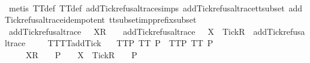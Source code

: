 %
\isadelimproof
\ \ %
\endisadelimproof
%
\isatagproof
{}\isamarkupfalse%
\ {\isacharparenleft}metis\ TT{}{\isacharunderscore}def\ TT{}{\isacharunderscore}def\ add{\isacharunderscore}Tick{\isacharunderscore}refusal{\isacharunderscore}trace{\isachardot}simps{\isacharparenleft}{}{\isacharparenright}\ add{\isacharunderscore}Tick{\isacharunderscore}refusal{\isacharunderscore}trace{\isacharunderscore}tt{\isacharunderscore}subset\ add{\isacharunderscore}Tick{\isacharunderscore}refusal{\isacharunderscore}trace{\isacharunderscore}idempotent\ tt{\isacharunderscore}subset{\isacharunderscore}imp{\isacharunderscore}prefix{\isacharunderscore}subset{\isacharparenright}%
\endisatagproof
{\isafoldproof}%
%
\isadelimproof
\isanewline
%
\endisadelimproof
\isanewline
{}\isamarkupfalse%
\ {\isachardoublequoteopen}add{\isacharunderscore}Tick{\isacharunderscore}refusal{\isacharunderscore}trace\ {\isacharparenleft}{\isasymrho}\ {\isacharat}\ {\isacharbrackleft}X{\isacharbrackright}\isactrlsub R\ {\isacharhash}\ {\isasymsigma}{\isacharparenright}\ {\isacharequal}\ add{\isacharunderscore}Tick{\isacharunderscore}refusal{\isacharunderscore}trace\ {\isasymrho}\ {\isacharat}\ {\isacharbrackleft}X\ {\isasymunion}\ {\isacharbraceleft}Tick{\isacharbraceright}{\isacharbrackright}\isactrlsub R\ {\isacharhash}\ add{\isacharunderscore}Tick{\isacharunderscore}refusal{\isacharunderscore}trace\ {\isasymsigma}{\isachardoublequoteclose}\isanewline
%
\isadelimproof
\ \ %
\endisadelimproof
%
\isatagproof
{}\isamarkupfalse%
%
\endisatagproof
{\isafoldproof}%
%
\isadelimproof
\isanewline
%
\endisadelimproof
\isanewline
{}\isamarkupfalse%
\ TT{}{\isacharunderscore}TT{}{\isacharunderscore}add{\isacharunderscore}Tick{\isacharcolon}\isanewline
\ \ \ TT{}{\isacharunderscore}P{\isacharcolon}\ {\isachardoublequoteopen}TT{}\ P{\isachardoublequoteclose}\ \ TT{}{\isacharunderscore}P{\isacharcolon}\ {\isachardoublequoteopen}TT{}\ P{\isachardoublequoteclose}\isanewline
\ \ \ {\isachardoublequoteopen}{\isasymrho}\ {\isacharat}\ {\isacharbrackleft}X{\isacharbrackright}\isactrlsub R\ {\isacharhash}\ {\isasymsigma}\ {\isasymin}\ P\ {\isasymLongrightarrow}\ {\isasymrho}\ {\isacharat}\ {\isacharbrackleft}X\ {\isasymunion}\ {\isacharbraceleft}Tick{\isacharbraceright}{\isacharbrackright}\isactrlsub R\ {\isacharhash}\ {\isasymsigma}\ {\isasymin}\ P{\isachardoublequoteclose}\isanewline
%
\isadelimproof
